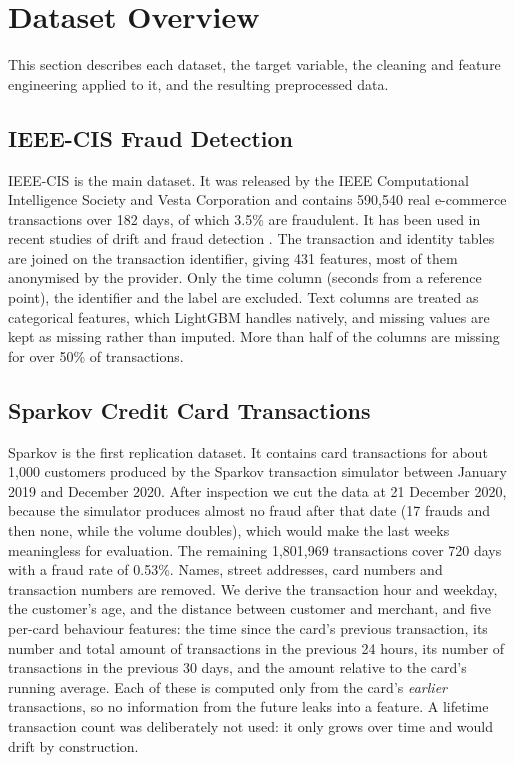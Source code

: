 \section{Dataset Overview}\label{sec:data}

This section describes each dataset, the target variable, the cleaning and feature engineering applied to it, and the resulting preprocessed data.

\subsection{IEEE-CIS Fraud Detection}\label{sec:ieeecis}

IEEE-CIS is the main dataset. It was released by the IEEE Computational Intelligence Society and Vesta Corporation and contains 590,540 real e-commerce transactions over 182 days, of which 3.5\% are fraudulent. It has been used in recent studies of drift and fraud detection \cite{menezes2025,uddin2026}. The transaction and identity tables are joined on the transaction identifier, giving 431 features, most of them anonymised by the provider. Only the time column (seconds from a reference point), the identifier and the label are excluded. Text columns are treated as categorical features, which LightGBM handles natively, and missing values are kept as missing rather than imputed. More than half of the columns are missing for over 50\% of transactions.

\subsection{Sparkov Credit Card Transactions}\label{sec:sparkovds}

Sparkov is the first replication dataset. It contains card transactions for about 1,000 customers produced by the Sparkov transaction simulator between January 2019 and December 2020. After inspection we cut the data at 21 December 2020, because the simulator produces almost no fraud after that date (17 frauds and then none, while the volume doubles), which would make the last weeks meaningless for evaluation. The remaining 1,801,969 transactions cover 720 days with a fraud rate of 0.53\%. Names, street addresses, card numbers and transaction numbers are removed. We derive the transaction hour and weekday, the customer's age, and the distance between customer and merchant, and five per-card behaviour features: the time since the card's previous transaction, its number and total amount of transactions in the previous 24 hours, its number of transactions in the previous 30 days, and the amount relative to the card's running average. Each of these is computed only from the card's \textit{earlier} transactions, so no information from the future leaks into a feature. A lifetime transaction count was deliberately not used: it only grows over time and would drift by construction.

